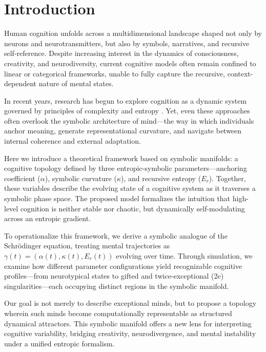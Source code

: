 

\section*{Introduction}

Human cognition unfolds across a multidimensional landscape shaped not only by neurons and neurotransmitters, but also by symbols, narratives, and recursive self-reference. Despite increasing interest in the dynamics of consciousness, creativity, and neurodiversity, current cognitive models often remain confined to linear or categorical frameworks, unable to fully capture the recursive, context-dependent nature of mental states.

In recent years, research has begun to explore cognition as a dynamic system governed by principles of complexity and entropy \cite{carhart2014entropic, bassett2017network}. Yet, even these approaches often overlook the symbolic architecture of mind—the way in which individuals anchor meaning, generate representational curvature, and navigate between internal coherence and external adaptation.

Here we introduce a theoretical framework based on symbolic manifolds: a cognitive topology defined by three entropic-symbolic parameters—anchoring coefficient ($\alpha$), symbolic curvature ($\kappa$), and recursive entropy ($E_r$). Together, these variables describe the evolving state of a cognitive system as it traverses a symbolic phase space. The proposed model formalizes the intuition that high-level cognition is neither stable nor chaotic, but dynamically self-modulating across an entropic gradient.

To operationalize this framework, we derive a symbolic analogue of the Schrödinger equation, treating mental trajectories as $\gamma(t) = (\alpha(t), \kappa(t), E_r(t))$ evolving over time. Through simulation, we examine how different parameter configurations yield recognizable cognitive profiles—from neurotypical states to gifted and twice-exceptional (2e) singularities—each occupying distinct regions in the symbolic manifold.

Our goal is not merely to describe exceptional minds, but to propose a topology wherein such minds become computationally representable as structured dynamical attractors. This symbolic manifold offers a new lens for interpreting cognitive variability, bridging creativity, neurodivergence, and mental instability under a unified entropic formalism.